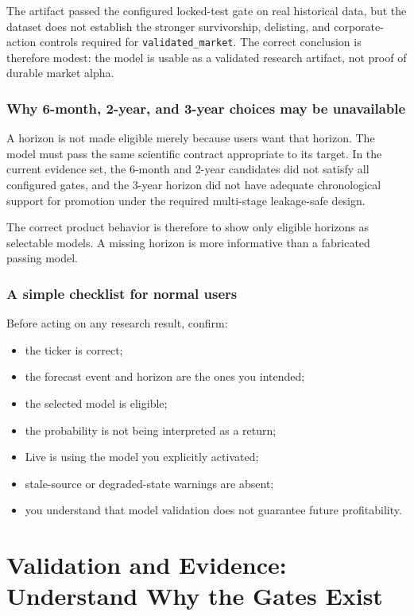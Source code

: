 \documentclass[11pt]{article}
\begin{document}
The artifact passed the configured locked-test gate on real historical data, but the dataset does not establish the stronger survivorship, delisting, and corporate-action controls required for \texttt{validated\_market}. The correct conclusion is therefore modest: the model is usable as a validated research artifact, not proof of durable market alpha.

\section{Why 6-month, 2-year, and 3-year choices may be unavailable}

A horizon is not made eligible merely because users want that horizon. The model must pass the same scientific contract appropriate to its target. In the current evidence set, the 6-month and 2-year candidates did not satisfy all configured gates, and the 3-year horizon did not have adequate chronological support for promotion under the required multi-stage leakage-safe design.

The correct product behavior is therefore to show only eligible horizons as selectable models. A missing horizon is more informative than a fabricated passing model.

\section{A simple checklist for normal users}

Before acting on any research result, confirm:

\begin{itemize}
\item the ticker is correct;
\item the forecast event and horizon are the ones you intended;
\item the selected model is eligible;
\item the probability is not being interpreted as a return;
\item Live is using the model you explicitly activated;
\item stale-source or degraded-state warnings are absent;
\item you understand that model validation does not guarantee future profitability.
\end{itemize}

\part{Validation and Evidence: Understand Why the Gates Exist}
\end{document}
